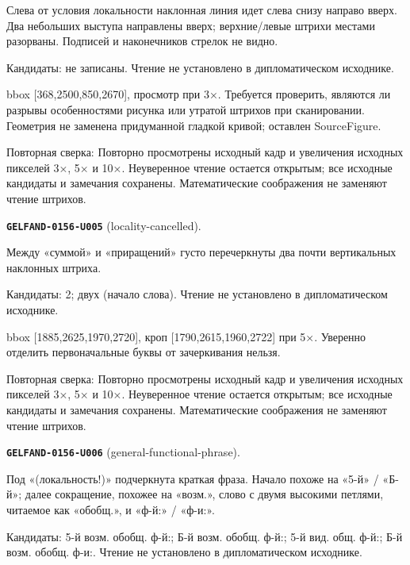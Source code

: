 Слева от условия локальности наклонная линия идет слева снизу направо вверх. Два небольших выступа направлены вверх; верхние/левые штрихи местами разорваны. Подписей и наконечников стрелок не видно.\par
Кандидаты: не записаны. Чтение не установлено в дипломатическом исходнике.\par
bbox [368,2500,850,2670], просмотр при 3×. Требуется проверить, являются ли разрывы особенностями рисунка или утратой штрихов при сканировании. Геометрия не заменена придуманной гладкой кривой; оставлен SourceFigure.\par
Повторная сверка: Повторно просмотрены исходный кадр и увеличения исходных пикселей 3×, 5× и 10×. Неуверенное чтение остается открытым; все исходные кандидаты и замечания сохранены. Математические соображения не заменяют чтение штрихов.\par\medskip
\par\noindent\leavevmode{}\label{GELFAND-0156-U005}\label{GELFAND-P001438:locality-cancelled}\textbf{\texttt{GELFAND-0156-U005}} (locality-cancelled).\nopagebreak[4]\par
Между «суммой» и «приращений» густо перечеркнуты два почти вертикальных наклонных штриха.\par
Кандидаты: 2; двух (начало слова). Чтение не установлено в дипломатическом исходнике.\par
bbox [1885,2625,1970,2720], кроп [1790,2615,1960,2722] при 5×. Уверенно отделить первоначальные буквы от зачеркивания нельзя.\par
Повторная сверка: Повторно просмотрены исходный кадр и увеличения исходных пикселей 3×, 5× и 10×. Неуверенное чтение остается открытым; все исходные кандидаты и замечания сохранены. Математические соображения не заменяют чтение штрихов.\par\medskip
\par\noindent\leavevmode{}\label{GELFAND-0156-U006}\label{GELFAND-P001438:general-functional-phrase}\textbf{\texttt{GELFAND-0156-U006}} (general-functional-phrase).\nopagebreak[4]\par
Под «(локальность!)» подчеркнута краткая фраза. Начало похоже на «5-й» / «Б-й»; далее сокращение, похожее на «возм.», слово с двумя высокими петлями, читаемое как «обобщ.», и «ф-й:» / «ф-и:».\par
Кандидаты: 5-й возм. обобщ. ф-й:; Б-й возм. обобщ. ф-й:; 5-й вид. общ. ф-й:; Б-й возм. обобщ. ф-и:. Чтение не установлено в дипломатическом исходнике.\par
